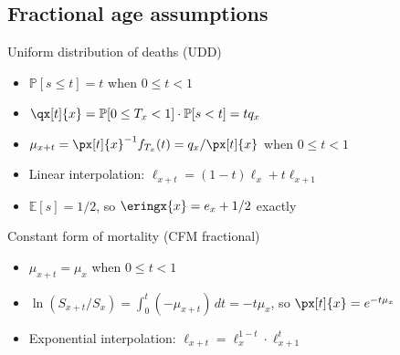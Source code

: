\subsection{Fractional age assumptions}

Uniform distribution of deaths (UDD)
\begin{itemize}
\item $\mathbb{P}[s\leq t] = t$ when $0\leq t < 1$
\item $\qx[t]{x} = \mathbb{P}[0\leq T_x < 1]\cdot\mathbb{P}[s < t] = tq_x$
\item $\mu_{x + t} = \px[t]{x}^{-1}f_{T_x}(t) = q_x/\px[t]{x}$ when $0\leq t < 1$
\item Linear interpolation: $\ell_{x + t} = (1 - t)\ell_x + t\ell_{x + 1}$
\item $\mathbb{E}[s] = 1/2$, so $\eringx{x} = e_x + 1/2$ exactly
\end{itemize}

Constant form of mortality (CFM fractional)
\begin{itemize}
\item $\mu_{x + t} = \mu_x$ when $0\leq t < 1$
\item $\ln (S_{x + t} / S_x) = \int_0^t (-\mu_{x + t})\,dt = -t\mu_x$, so $\px[t]{x} = e^{-t\mu_x}$
\item Exponential interpolation: $\ell_{x + t} = \ell_x^{1 - t}\cdot\ell_{x + 1}^t$
\end{itemize}